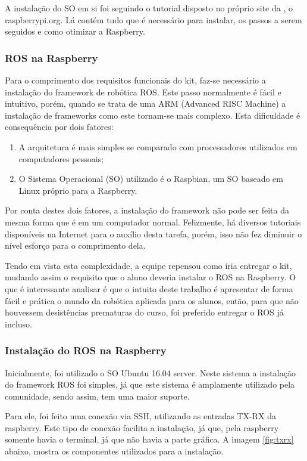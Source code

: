 A instalação do SO em si foi seguindo o tutorial disposto no próprio site da \cite{RASPB}, o raspberrypi.org. Lá contém tudo que é necessário para instalar, os passos a serem seguidos e como otimizar a Raspberry.
\subsubsection{ROS na Raspberry}
Para o comprimento dos requisitos funcionais do kit, faz-se necessário a instalação do framework de robótica ROS. Este passo normalmente é fácil e intuitivo, porém, quando se trata de uma ARM (Advanced RISC Machine) a instalação de frameworks como este tornam-se mais complexo. Esta dificuldade é consequência por dois fatores:

\begin{enumerate}
	\item A arquitetura é mais simples se comparado com processadores utilizados em computadores pessoais;
	\item O Sistema Operacional (SO) utilizado é o Raspbian, um SO baseado em Linux próprio para a Raspberry. 
\end{enumerate}

Por conta destes dois fatores, a instalação do framework não pode ser feita da mesma forma que é em um computador normal. Felizmente, há diversos tutoriais disponíveis na Internet para o auxílio desta tarefa, porém, isso não fez diminuir o nível esforço para o comprimento dela. 

Tendo em vista esta complexidade, a equipe repensou como iria entregar o kit, mudando assim o requisito que o aluno deveria instalar o ROS na Raspberry. O que é interessante analisar é que o intuito deste trabalho é apresentar de forma fácil e prática o mundo da robótica aplicada para os alunos, então, para que não houvessem desistências prematuras do curso, foi preferido entregar o ROS já incluso.
\subsubsection{Instalação do ROS na Raspberry}

Inicialmente, foi utilizado o SO Ubuntu 16.04 server. Neste sistema a instalação do framework ROS foi simples, já que este sistema é amplamente utilizado pela comunidade, sendo assim, tem uma maior suporte.

Para ele, foi feito uma conexão via SSH, utilizando as entradas TX-RX da raspberry. Este tipo de conexão facilita a instalação, já que, pela raspberry somente havia o terminal, já que não havia a parte gráfica. A imagem \ref{fig:txrx} abaixo, mostra os componentes utilizados para a instalação.

